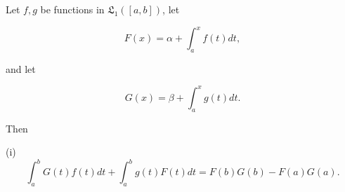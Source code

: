 Let $f, g$ be functions in $\mathfrak{L}_1([a, b])$, let

$$F(x) = \alpha + \int_a^x f(t) dt,$$

and let

$$G(x) = \beta + \int_a^x g(t) dt.$$

Then

(i) $$\int_a^b G(t) f(t) dt + \int_a^b g(t) F(t) dt = F(b) G(b) - F(a) G(a).$$